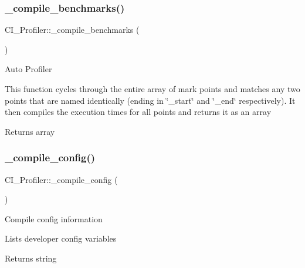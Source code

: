 \subsubsection{\texorpdfstring{\+\_\+compile\+\_\+benchmarks()}{\_compile\_benchmarks()}}
{\footnotesize\ttfamily C\+I\+\_\+\+Profiler\+::\+\_\+compile\+\_\+benchmarks (\begin{DoxyParamCaption}{ }\end{DoxyParamCaption})\hspace{0.3cm}{\ttfamily [protected]}}

Auto Profiler

This function cycles through the entire array of mark points and matches any two points that are named identically (ending in \char`\"{}\+\_\+start\char`\"{} and \char`\"{}\+\_\+end\char`\"{} respectively). It then compiles the execution times for all points and returns it as an array

\begin{DoxyReturn}{Returns}
array 
\end{DoxyReturn}
\mbox{\label{class_c_i___profiler_ace753d141bc10001e04a49db24525b5a}} 
\subsubsection{\texorpdfstring{\+\_\+compile\+\_\+config()}{\_compile\_config()}}
{\footnotesize\ttfamily C\+I\+\_\+\+Profiler\+::\+\_\+compile\+\_\+config (\begin{DoxyParamCaption}{ }\end{DoxyParamCaption})\hspace{0.3cm}{\ttfamily [protected]}}

Compile config information

Lists developer config variables

\begin{DoxyReturn}{Returns}
string 
\end{DoxyReturn}
\mbox{\label{class_c_i___profiler_a039a27f27a6ec3e43eee49ff3d93fa28}} 

